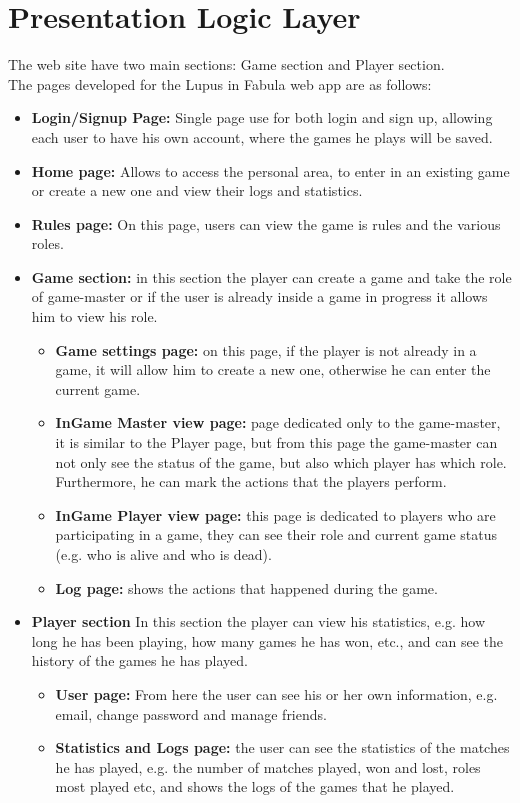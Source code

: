 \section{Presentation Logic Layer}




The web site have two main sections: Game section and Player section.\\
The pages developed for the Lupus in Fabula web app are as follows:
\begin{itemize}
    \item \textbf{Login/Signup Page:} Single page use for both login and sign up, allowing each user to have his own account, where the games he plays will be saved.
    \item \textbf{Home page:} Allows to access the personal area, to enter in an existing game or create a new one and view their logs and statistics.
    \item \textbf{Rules page:} On this page, users can view the game is rules and the various roles.
    \item \textbf{Game section:} in this section the player can create a game and take the role of game-master or if the user is already inside a game in progress it allows him to view his role.
    \begin{itemize}
        \item \textbf{Game settings page:} on this page, if the player is not already in a game, it will allow him to create a new one, otherwise he can enter the current game.
        \item \textbf{InGame Master view page:} page dedicated only to the game-master, it is similar to the Player page, but from this page the game-master can not only see the status of the game, but also which player has which role. Furthermore, he can mark the actions that the players perform.
        \item \textbf{InGame Player view page:} this page is dedicated to players who are participating in a game, they can see their role and current game status (e.g. who is alive and who is dead).
        \item \textbf{Log page:} shows the actions that happened during the game.
    \end{itemize}
    \item \textbf{Player section} In this section the player can view his statistics, e.g. how long he has been playing, how many games he has won, etc., and can see the history of the games he has played.
    \begin{itemize}
        \item \textbf{User page:} From here the user can see his or her own information, e.g. email, change password and manage friends.
        \item \textbf{Statistics and Logs page:} the user can see the statistics of the matches he has played, e.g. the number of matches played, won and lost, roles most played etc, and shows the logs of the games that he played.
    \end{itemize}
\end{itemize}

